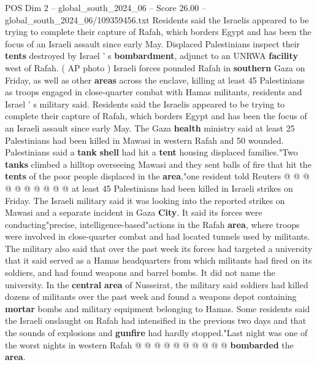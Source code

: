 \begin{textsample}{POS Dim 2 – global\_south\_2024\_06 – Score 26.00 – global\_south\_2024\_06/109359456.txt}  \label{ex:f2_pos_057}
Residents said the Israelis appeared to be trying to complete their capture of Rafah, which borders Egypt and has been the focus of an Israeli assault since early May.
Displaced Palestinians inspect their \textbf{tents} destroyed by Israel ' s \textbf{bombardment}, adjunct to an UNRWA \textbf{facility} west of Rafah. ( AP photo ) Israeli forces pounded Rafah in \textbf{southern} Gaza on Friday, as well as other \textbf{areas} across the enclave, killing at least 45 Palestinians as troops engaged in close-quarter combat with Hamas militants, residents and Israel ' s military said.
Residents said the Israelis appeared to be trying to complete their capture of Rafah, which borders Egypt and has been the focus of an Israeli assault since early May.
The Gaza \textbf{health} ministry said at least 25 Palestinians had been killed in Mawasi in western Rafah and 50 wounded.
Palestinians said a \textbf{tank} \textbf{shell} had hit a \textbf{tent} housing displaced families."Two \textbf{tanks} climbed a hilltop overseeing Mawasi and they sent balls of fire that hit the \textbf{tents} of the poor people displaced in the \textbf{area},"one resident told Reuters @ @ @ @ @ @ @ @ @ @ at least 45 Palestinians had been killed in Israeli strikes on Friday.
The Israeli military said it was looking into the reported strikes on Mawasi and a separate incident in Gaza \textbf{City}.
It said its forces were conducting"precise, intelligence-based"actions in the Rafah \textbf{area}, where troops were involved in close-quarter combat and had located tunnels used by militants.
The military also said that over the past week its forces had targeted a university that it said served as a Hamas headquarters from which militants had fired on its soldiers, and had found weapons and barrel bombs.
It did not name the university.
In the \textbf{central} \textbf{area} of Nusseirat, the military said soldiers had killed dozens of militants over the past week and found a weapons depot containing \textbf{mortar} bombs and military equipment belonging to Hamas.
Some residents said the Israeli onslaught on Rafah had intensified in the previous two days and that the sounds of explosions and \textbf{gunfire} had hardly stopped."Last night was one of the worst nights in western Rafah @ @ @ @ @ @ @ @ @ @ \textbf{bombarded} the \textbf{area}.

\end{textsample}
